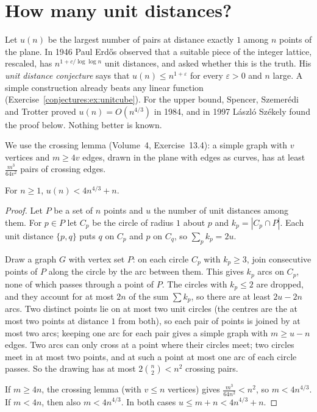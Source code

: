\section{How many unit distances?}

Let $u(n)$ be the largest number of pairs at distance exactly $1$ among $n$ points of the plane. In 1946 Paul Erd\H os observed that a suitable piece of
the integer lattice, rescaled, has $n^{1+c/\log\log n}$ unit distances, and asked whether this is the truth. His \emph{unit distance conjecture} says
that $u(n)\le n^{1+\varepsilon}$ for every $\varepsilon>0$ and $n$ large. A simple construction already beats any linear function
(Exercise~\ref{conjectures:ex:unitcube}). For the upper bound, Spencer, Szemer\'edi and Trotter proved $u(n)=O(n^{4/3})$ in 1984, and in 1997 L\'aszl\'o Sz\'ekely
found the proof below. Nothing better is known.

We use the crossing lemma (Volume~4, Exercise~13.4): a simple graph with $v$ vertices and $m\ge4v$ edges, drawn in the plane with edges as curves, has at
least $\frac{m^3}{64v^2}$ pairs of crossing edges.

\begin{theorem}\label{conjectures:thm:unitdist}
For $n\ge1$, $u(n)<4n^{4/3}+n$.
\end{theorem}
\begin{proof}
Let $P$ be a set of $n$ points and $u$ the number of unit distances among them. For $p\in P$ let $C_p$ be the circle of radius $1$ about $p$ and
$k_p=|C_p\cap P|$. Each unit distance $\{p,q\}$ puts $q$ on $C_p$ and $p$ on $C_q$, so $\sum_pk_p=2u$.

Draw a graph $G$ with vertex set $P$: on each circle $C_p$ with $k_p\ge3$, join consecutive points of $P$ along the circle by the arc between them. This
gives $k_p$ arcs on $C_p$, none of which passes through a point of $P$. The circles with $k_p\le2$ are dropped, and they account for at most $2n$ of the
sum $\sum k_p$, so there are at least $2u-2n$ arcs. Two distinct points lie on at most two unit circles (the centres are the at most two points at
distance $1$ from both), so each pair of points is joined by at most two arcs; keeping one arc for each pair gives a simple graph with
$m\ge u-n$ edges. Two arcs can only cross at a point where their circles meet; two circles meet in at most two points, and at such a point at most one
arc of each circle passes. So the drawing has at most $2\binom n2<n^2$ crossing pairs.

If $m\ge4n$, the crossing lemma (with $v\le n$ vertices) gives $\frac{m^3}{64n^2}<n^2$, so $m<4n^{4/3}$. If $m<4n$, then also $m<4n^{4/3}$. In both cases
$u\le m+n<4n^{4/3}+n$.
\end{proof}

